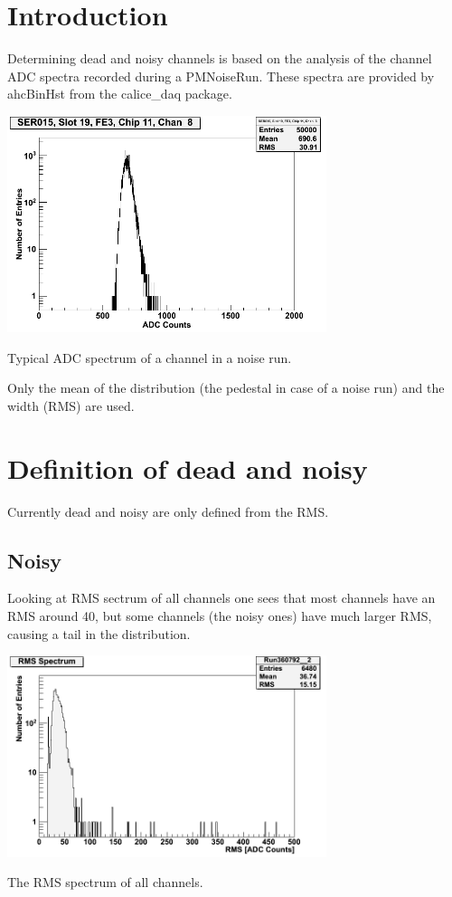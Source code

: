 \hypertarget{index_Introduction}{}\section{Introduction}\label{index_Introduction}
Determining dead and noisy channels is based on the analysis of the channel A\-D\-C spectra recorded during a P\-M\-Noise\-Run. These spectra are provided by {\ttfamily ahc\-Bin\-Hst} from the {\ttfamily calice\-\_\-daq} package.

 
\begin{DoxyImage}
\includegraphics[width=0.7\textwidth]{normal_channel_spectrum.png}
\caption{Typical A\-D\-C spectrum of a channel in a noise run.}
\end{DoxyImage}


Only the mean of the distribution (the pedestal in case of a noise run) and the width (R\-M\-S) are used.\hypertarget{index_Definition}{}\section{Definition of dead and noisy}\label{index_Definition}
Currently dead and noisy are only defined from the R\-M\-S. \hypertarget{index_Noisy}{}\subsection{Noisy}\label{index_Noisy}
Looking at R\-M\-S sectrum of all channels one sees that most channels have an R\-M\-S around 40, but some channels (the noisy ones) have much larger R\-M\-S, causing a tail in the distribution.

 
\begin{DoxyImage}
\includegraphics[width=0.7\textwidth]{rms_spectrum.png}
\caption{The R\-M\-S spectrum of all channels.}
\end{DoxyImage}



